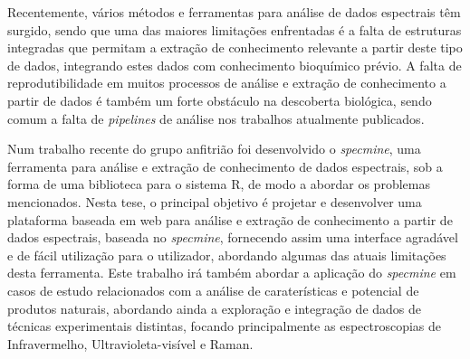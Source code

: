 Recentemente, vários métodos e ferramentas para análise de dados espectrais têm surgido, sendo que uma das maiores limitações enfrentadas é a falta de estruturas integradas que permitam a extração de conhecimento relevante a partir deste tipo de dados, integrando estes dados com conhecimento bioquímico prévio. A falta de reprodutibilidade em muitos processos de análise e extração de conhecimento a partir de dados é também um forte obstáculo na descoberta biológica, sendo comum a falta de \textit{pipelines} de análise nos trabalhos atualmente publicados.

Num trabalho recente do grupo anfitrião foi desenvolvido o \textit{specmine}, uma ferramenta para análise e extração de conhecimento de dados espectrais, sob a forma de uma biblioteca para o sistema R, de modo a abordar os problemas mencionados. Nesta tese, o principal objetivo é projetar e desenvolver uma plataforma baseada em web para análise e extração de conhecimento a partir de dados espectrais, baseada no \textit{specmine}, fornecendo assim uma interface agradável e de fácil utilização para o utilizador, abordando algumas das atuais limitações desta ferramenta. Este trabalho irá também abordar a aplicação do \textit{specmine} em casos de estudo relacionados com a análise de caraterísticas e potencial de produtos naturais, abordando ainda a exploração e integração de dados de técnicas experimentais distintas, focando principalmente as espectroscopias de Infravermelho, Ultravioleta-visível e Raman.



